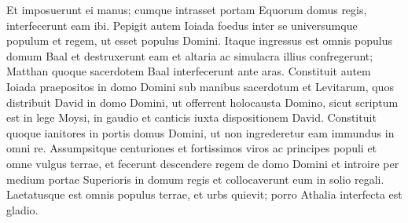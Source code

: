 \begin{biblechapter}
\verse Et imposuerunt ei manus; cumque intrasset portam Equorum domus regis, interfecerunt eam ibi. 
\verse Pepigit autem Ioiada foedus inter se universumque populum et regem, ut esset populus Domini. 
\verse Itaque ingressus est omnis populus domum Baal et destruxerunt eam et altaria ac simulacra illius confregerunt; Matthan quoque sacerdotem Baal interfecerunt ante aras. 
\verse Constituit autem Ioiada praepositos in domo Domini sub manibus sacerdotum et Levitarum, quos distribuit David in domo Domini, ut offerrent holocausta Domino, sicut scriptum est in lege Moysi, in gaudio et canticis iuxta dispositionem David. 
\verse Constituit quoque ianitores in portis domus Domini, ut non ingrederetur eam immundus in omni re.  
\verse Assumpsitque centuriones et fortissimos viros ac principes populi et omne vulgus terrae, et fecerunt descendere regem de domo Domini et introire per medium portae Superioris in domum regis et collocaverunt eum in solio regali.  
\verse Laetatusque est omnis populus terrae, et urbs quievit; porro Athalia interfecta est gladio. 
\end{biblechapter}

